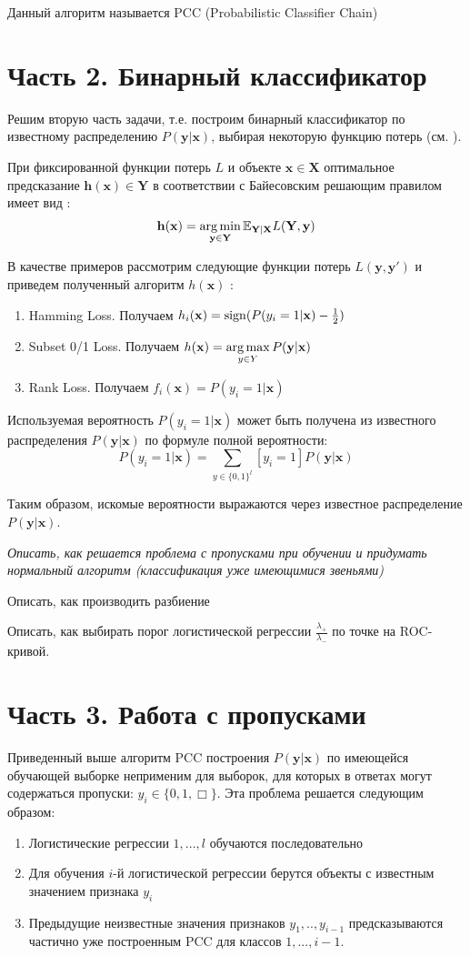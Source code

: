 \documentclass[12pt,twoside]{article}
\newcommand{\x}{\mathbf{x}}
\newcommand{\h}{\mathbf{h}}
\newcommand{\y}{\mathbf{y}}
\newcommand{\X}{\mathbf{X}}
\newcommand{\Y}{\mathbf{Y}}
\begin{document}
Данный алгоритм называется PCC (Probabilistic Classifier Chain) \cite{weiwei2010}

\section{Часть 2. Бинарный классификатор}
Решим вторую часть задачи, т.е. построим бинарный классификатор по известному распределению $P(\y|\x)$, выбирая некоторую функцию потерь (см. \cite{weiwei2010}).

При фиксированной функции потерь $L$ и объекте $\x\in\X$ оптимальное предсказание $\h(\x)\in\Y$ в соответствии с Байесовским решающим правилом имеет вид \cite{weiwei2010}:
$$\h(\x)=\argmin\limits_{\y\in\Y}\mathbb{E}_{\Y|\X}L(\Y,\y)$$


В качестве примеров рассмотрим следующие функции потерь $L(\y,\y')$ и приведем полученный алгоритм $h(\x)$ \cite{weiwei2010}:

\begin{enumerate}
\item Hamming Loss. Получаем $h_i(\x)=\sign(P(y_i=1|\x)-\frac{1}{2})$
\item Subset 0/1 Loss. Получаем $h(\x)=\argmax_{y\in Y}P(\y|\x)$
\item Rank Loss. Получаем $f_i(\x)=P(y_i=1|\x)$
\end{enumerate}

Используемая вероятность $P(y_i=1|\x)$ может быть получена из известного распределения $P(\y|\x)$ по формуле полной вероятности:
$$P(y_i=1|\x)=\sum\limits_{y\in \{0,1\}^l}[y_i=1]P(\y|\x)$$

Таким образом, искомые вероятности выражаются через известное распределение $P(\y|\x)$.

{\em
Описать, как решается проблема с пропусками при обучении и придумать нормальный алгоритм (классификация уже имеющимися звеньями)

Описать, как производить разбиение

Описать, как выбирать порог логистической регрессии $\frac{\lambda_+}{\lambda_-}$ по точке на ROC-кривой.
}
\section{Часть 3. Работа с пропусками}
Приведенный выше алгоритм PCC построения $P(\y|\x)$ по имеющейся обучающей выборке неприменим для выборок, для которых в ответах могут содержаться пропуски: $y_i\in\{0,1,\Box\}$. Эта проблема решается следующим образом:
\begin{enumerate}
\item Логистические регрессии $1,...,l$ обучаются последовательно
\item Для обучения $i$-й логистической регрессии берутся объекты с известным значением признака $y_i$
\item Предыдущие неизвестные значения признаков $y_1,..,y_{i-1}$ предсказываются частично уже построенным PCC для классов $1,...,{i-1}$.
\end{enumerate}
\end{document}
